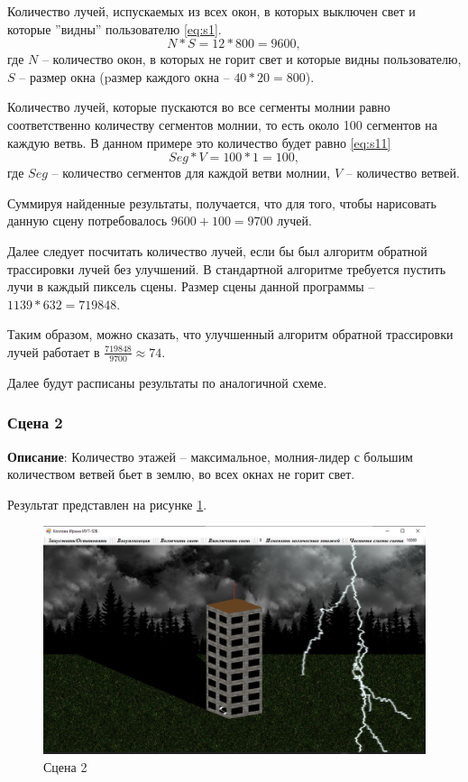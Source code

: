 Количество лучей, испускаемых из всех окон, в которых выключен свет и которые ''видны'' пользователю \ref{eq:s1}.
\begin{equation}
	\label{eq:s1}
	N * S =  12 * 800 = 9600,
\end{equation}
где $N$ -- количество окон, в которых не горит свет и которые видны пользователю, $S$ -- размер окна (pазмер каждого окна -- $40 * 20 = 800$).

Количество лучей, которые пускаются во все сегменты молнии равно соответственно количеству сегментов молнии, то есть около 100 сегментов на каждую ветвь. В данном примере это количество будет равно \ref{eq:s11}
\begin{equation}
	\label{eq:s11}
	Seg * V = 100 * 1 = 100,
\end{equation}
где $Seg$ -- количество сегментов для каждой ветви молнии, $V$ -- количество ветвей.

Суммируя найденные результаты, получается, что для того, чтобы нарисовать данную сцену потребовалось $9600 + 100 = 9 700$ лучей.

Далее следует посчитать количество лучей, если бы был алгоритм обратной трассировки лучей без улучшений. 
В стандартной алгоритме требуется пустить лучи в каждый пиксель сцены. Размер сцены данной программы -- $1139 * 632 = 719 848$. 

Таким образом, можно сказать, что улучшенный алгоритм обратной трассировки лучей работает в $\frac{719 848}{9700} \approx 74$. 

Далее будут расписаны результаты по аналогичной схеме.

\subsubsection{Сцена 2}
\textbf{Описание}: Количество этажей -- максимальное, молния-лидер с большим количеством ветвей бьет в землю, во всех окнах не горит свет.

Результат представлен на рисунке \ref{img:s2}.
\begin{figure}[H]
	\begin{center}
		\includegraphics[scale=0.40]{img/prog_res/s2.png}
	\end{center}
	\captionsetup{justification=centering}
	\caption{Сцена 2}
	\label{img:s2}
\end{figure}

